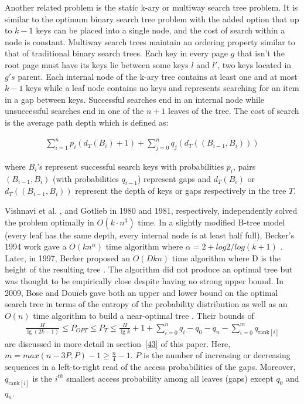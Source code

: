 \documentclass[letterpaper,12pt,titlepage,oneside,final]{book}
\theoremstyle{plain}
\begin{document}
Another related problem is the static k-ary or multiway search tree problem. It is similar to the optimum binary search tree problem with the added option that up to $k-1$ keys can be placed into a single node, and the cost of search within a node is constant. Multiway search trees maintain an ordering property similar to that of traditional binary search trees. Each key in every page $g$ that isn't the root page must have its keys lie between some keys $l$ and $l'$, two keys located in $g's$ parent. Each internal node of the k-ary tree contains at least one and at most $k-1$ keys while a leaf node contains no keys and represents searching for an item in a gap between keys. Successful searches end in an internal node while unsuccessful searches end in one of the $n+1$ leaves of the tree. The cost of search is the average path depth which is defined as:

\begin{align*}
\sum_{i=1}^{n} p_i(d_T(B_i)+1) + \sum_{j=0}^{n} q_j(d_T((B_{i-1},B_i)))
\end{align*}

\noindent where $B_i$'s represent successful search keys with probabilities $p_i$, pairs $(B_{i-1},B_i)$ (with probabilities $q_{i-1}$) represent gaps and $d_T(B_i)$  or $d_T((B_{i-1},B_i))$ represent the depth of keys or gaps respectively in the tree $T$.

Vishnavi et al. \cite{vaishnavi1980optimum}, and Gotlieb  \cite{gotlieb1981optimal} in 1980 and 1981, respectively, independently solved the problem optimally in $O(k\cdot n^3)$ time. In a slightly modified B-tree model (every leaf has the same depth, every internal node is at least half full), Becker's 1994 work gave a $O(kn^{\alpha})$ time algorithm where $\alpha=2+log2/log(k+1)$ \cite{becker1994new}. Later, in 1997, Becker proposed an $O(Dkn)$ time algorithm where D is the height of the resulting tree \cite{becker1997construction}. The algorithm did not produce an optimal tree but was thought to be empirically close despite having no strong upper bound. In 2009, Bose and Dou\"{i}eb gave both an upper and lower bound on the optimal search tree in terms of the entropy of the probability distribution as well as an $O(n)$ time algorithm to build a near-optimal tree \cite{bose2009efficient}. Their bounds of
\begin{align*}
\frac{H}{\lg(2k-1)} \leq P_{OPT} \leq P_T \leq \frac{H}{\lg k} + 1 + \sum_{i=0}^n q_i - q_0 - q_n - \sum_{i=0}^m q_{\text{rank}[i]}
\end{align*}
are discussed in more detail in section~\ref{43} of this paper. Here, $m=max({n-3P,P})-1 \geq \frac{n}{4} - 1$. $P$ is the number of increasing or decreasing sequences in a left-to-right read of the access probabilities of the gaps. Moreover, $q_{\text{rank}[i]}$ is the $i^{th}$ smallest access probability among all leaves (gaps) except $q_0$ and $q_n$.
\end{document}
